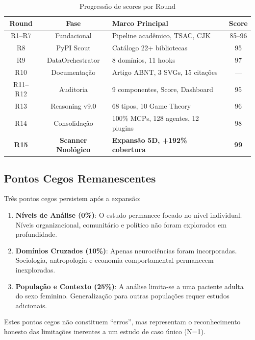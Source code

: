 \documentclass[12pt,a4paper]{article}
\begin{document}
\begin{table}[H]
  \centering
  \caption{Progressão de scores por Round}
  \begin{tabular}{c c l c}
    \toprule
    \textbf{Round} & \textbf{Fase} & \textbf{Marco Principal} & \textbf{Score} \\
    \midrule
    R1--R7   & Fundacional    & Pipeline acadêmico, TSAC, CJK       & 85--96 \\
    R8       & PyPI Scout     & Catálogo 22+ bibliotecas            & 95 \\
    R9       & DataOrchestrator & 8 domínios, 11 hooks              & 97 \\
    R10      & Documentação   & Artigo ABNT, 3 SVGs, 15 citações   & --- \\
    R11--R12 & Auditoria       & 9 componentes, Score, Dashboard     & 95 \\
    R13      & Reasoning v9.0 & 68 tipos, 10 Game Theory            & 96 \\
    R14      & Consolidação    & 100\% MCPs, 128 agentes, 12 plugins & 98 \\
    \textbf{R15} & \textbf{Scanner Noológico} & \textbf{Expansão 5D, +192\% cobertura} & \textbf{99} \\
    \bottomrule
  \end{tabular}
\end{table}

\subsection{Pontos Cegos Remanescentes}

Três pontos cegos persistem após a expansão:

\begin{enumerate}[itemsep=1pt]
  \item \textbf{Níveis de Análise (0\%)}: O estudo permanece focado no nível individual. Níveis organizacional, comunitário e político não foram explorados em profundidade.
  \item \textbf{Domínios Cruzados (10\%)}: Apenas neurociências foram incorporadas. Sociologia, antropologia e economia comportamental permanecem inexploradas.
  \item \textbf{População e Contexto (25\%)}: A análise limita-se a uma paciente adulta do sexo feminino. Generalização para outras populações requer estudos adicionais.
\end{enumerate}

Estes pontos cegos não constituem ``erros'', mas representam o reconhecimento honesto das limitações inerentes a um estudo de caso único (N=1).
\end{document}
